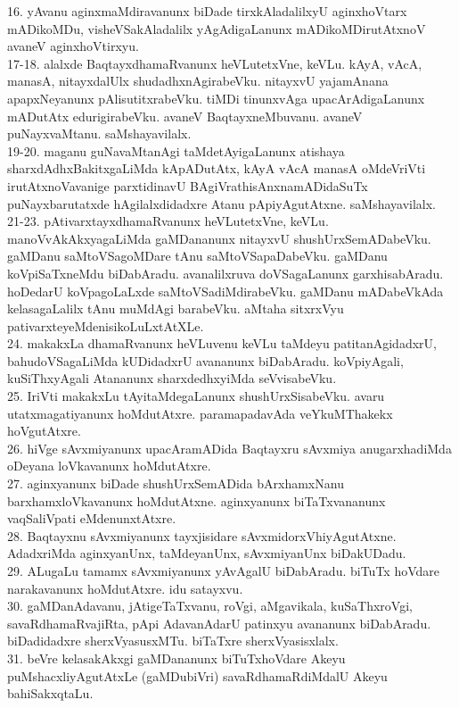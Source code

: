\documentclass{article}
\begin{document}
16. yAvanu aginxmaMdiravanunx biDade tirxkAladalilxyU aginxhoVtarx mADikoMDu, visheVSakAladalilx yAgAdigaLanunx mADikoMDirutAtxnoV avaneV aginxhoVtirxyu.\\
17-18. alalxde BaqtayxdhamaRvanunx heVLutetxVne, keVLu. kAyA, vAcA, manasA, nitayxdalUlx shudadhxnAgirabeVku. nitayxvU yajamAnana apapxNeyanunx pAlisutitxrabeVku. tiMDi tinunxvAga upacArAdigaLanunx mADutAtx edurigirabeVku. avaneV BaqtayxneMbuvanu. avaneV puNayxvaMtanu. saMshayavilalx.\\
19-20. maganu guNavaMtanAgi taMdetAyigaLanunx atishaya sharxdAdhxBakitxgaLiMda kApADutAtx, kAyA vAcA manasA oMdeVriVti irutAtxnoVavanige parxtidinavU BAgiVrathisAnxnamADidaSuTx puNayxbarutatxde hAgilalxdidadxre Atanu pApiyAgutAtxne. saMshayavilalx.\\
21-23. pAtivarxtayxdhamaRvanunx heVLutetxVne, keVLu. manoVvAkAkxyagaLiMda gaMDananunx nitayxvU shushUrxSemADabeVku. gaMDanu saMtoVSagoMDare tAnu saMtoVSapaDabeVku. gaMDanu koVpiSaTxneMdu biDabAradu. avanalilxruva doVSagaLanunx garxhisabAradu. hoDedarU koVpagoLaLxde saMtoVSadiMdirabeVku. gaMDanu mADabeVkAda kelasagaLalilx tAnu muMdAgi barabeVku. aMtaha sitxrxVyu pativarxteyeMdenisikoLuLxtAtXLe.\\
24. makakxLa dhamaRvanunx heVLuvenu keVLu taMdeyu patitanAgidadxrU, bahudoVSagaLiMda kUDidadxrU avananunx biDabAradu. koVpiyAgali, kuSiThxyAgali Atananunx sharxdedhxyiMda seVvisabeVku.\\
25. IriVti makakxLu tAyitaMdegaLanunx shushUrxSisabeVku. avaru utatxmagatiyanunx hoMdutAtxre. paramapadavAda veYkuMThakekx hoVgutAtxre.\\
26. hiVge sAvxmiyanunx upacAramADida Baqtayxru sAvxmiya anugarxhadiMda oDeyana loVkavanunx hoMdutAtxre.\\
27. aginxyanunx biDade shushUrxSemADida bArxhamxNanu barxhamxloVkavanunx hoMdutAtxne. aginxyanunx biTaTxvananunx vaqSaliVpati eMdenunxtAtxre.\\
28. Baqtayxnu sAvxmiyanunx tayxjisidare sAvxmidorxVhiyAgutAtxne. AdadxriMda aginxyanUnx, taMdeyanUnx, sAvxmiyanUnx biDakUDadu.\\
29. ALugaLu tamamx sAvxmiyanunx yAvAgalU biDabAradu. biTuTx hoVdare narakavanunx hoMdutAtxre. idu satayxvu.\\
30. gaMDanAdavanu, jAtigeTaTxvanu, roVgi, aMgavikala, kuSaThxroVgi, savaRdhamaRvajiRta, pApi AdavanAdarU patinxyu avananunx biDabAradu. biDadidadxre sherxVyasusxMTu. biTaTxre sherxVyasisxlalx.\\
31. beVre kelasakAkxgi gaMDananunx biTuTxhoVdare Akeyu puMshacxliyAgutAtxLe (gaMDubiVri) savaRdhamaRdiMdalU Akeyu bahiSakxqtaLu.\\
\end{document}
